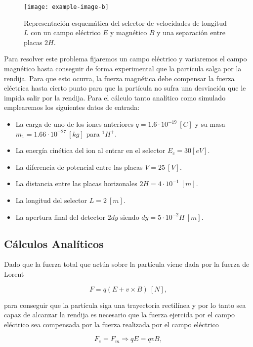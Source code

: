 \documentclass[journal]{IEEEtran}
\begin{document}
\begin{figure}[!htb]
    \texttt{[image: example-image-b]}
    \caption{Representación esquemática del selector de velocidades de longitud $L$ con un campo eléctrico $E$ y magnético $B$ y una separación entre placas $2H$.}
    \label{fig:selector}
\end{figure}

Para resolver este problema fijaremos un campo eléctrico y variaremos el campo magnético hasta conseguir de forma experimental que la partícula salga por la rendija. Para que esto ocurra, la fuerza magnética debe compensar la fuerza eléctrica hasta cierto punto para que la partícula no sufra una desviación que le impida salir por la rendija. Para el cálculo tanto analítico como simulado emplearemos los siguientes datos de entrada:

\begin{itemize}
    \item La carga de uno de los iones anteriores $q = 1.6\cdot10^{-19}~[C]$ y su masa $m_1 = 1.66\cdot10^{-27}~[kg]$ para $^1H^+$.
    \item La energía cinética del ion al entrar en el selector $E_c = 30 [eV]$.
    \item La diferencia de potencial entre las placas $V = 25~[V]$.
    \item La distancia entre las placas horizonales $2H = 4\cdot 10^{-1}~[m]$.
    \item La longitud del selector $L = 2~[m]$.
    \item La apertura final del detector $2dy$ siendo $dy = 5\cdot10^{-2}H~[m]$.
\end{itemize}

\subsection{Cálculos Analíticos}

Dado que la fuerza total que actúa sobre la partícula viene dada por la fuerza de Lorent

\begin{equation}
    F = q(E + v \times B)~[N],
\end{equation}

para conseguir que la partícula siga una trayectoria rectilínea y por lo tanto sea capaz de alcanzar la rendija es necesario que la fuerza ejercida por el campo eléctrico sea compensada por la fuerza realizada por el campo eléctrico

\begin{equation}
    F_e = F_m \Rightarrow qE = qvB,
\end{equation}
\end{document}
